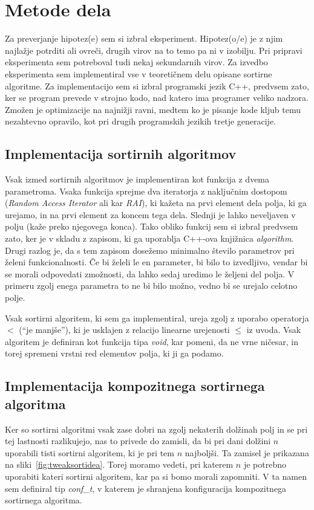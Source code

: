 \documentclass[a4paper,oneside,12pt]{article}
\begin{document}
\section{Metode dela}
Za preverjanje hipotez(e) sem si izbral eksperiment. Hipotez(o/e) je z njim najlažje
potrditi ali ovreči, drugih virov na to temo pa ni v izobilju. Pri pripravi eksperimenta
sem potreboval tudi nekaj sekundarnih virov. Za izvedbo eksperimenta sem implementiral vse 
v teoretičnem delu opisane sortirne algoritme. Za implementacijo sem si izbral programski 
jezik C++, predvsem zato, ker se program prevede v strojno kodo, nad katero ima programer
veliko nadzora. Zmožen je optimizacije na najnižji ravni, medtem ko je pisanje kode kljub
temu nezahtevno opravilo, kot pri drugih programskih jezikih tretje generacije.

\subsection{Implementacija sortirnih algoritmov}
\label{chapter:sortimplementation}
Vsak izmed sortirnih algoritmov je implementiran kot funkcija z dvema parametroma.
Vsaka funkcija sprejme dva iteratorja z naključnim dostopom (\emph{Random Access
Iterator} ali kar \emph{RAI}),
ki kažeta na prvi element dela polja, ki ga urejamo, in na prvi element za koncem tega dela.
Slednji je lahko neveljaven v polju (kaže preko njegovega konca).
Tako obliko funkcij sem si izbral predvsem zato, ker je v skladu z zapisom, ki ga uporablja
C++-ova knjižnica \emph{algorithm}. Drugi razlog je, da s tem zapisom dosežemo minimalno število
parametrov pri želeni funkcionalnosti. Če bi želeli le en parameter, bi bilo to
izvedljivo, vendar bi se morali odpovedati zmožnosti, da lahko sedaj uredimo le željeni
del polja. V primeru zgolj enega parametra to ne bi bilo možno, vedno bi se
urejalo celotno polje.

Vsak sortirni algoritem, ki sem ga implementiral, ureja zgolj z uporabo operatorja $<$
(``je manjše''), ki je usklajen z relacijo linearne urejenosti $\leq$ iz uvoda. Vsak
algoritem je definiran kot funkcija tipa \emph{void}, kar pomeni, da ne vrne ničesar, in
torej spremeni vrstni red elementov polja, ki ji ga podamo.

\subsection{Implementacija kompozitnega sortirnega algoritma}
\label{chapter:tweaksort}
Ker so sortirni algoritmi vsak zase dobri na zgolj nekaterih dolžinah polj in se pri tej
lastnosti razlikujejo, nas to privede do zamisli, da bi pri dani dolžini $n$ uporabili tisti
sortirni algoritem, ki je pri tem $n$ najboljši. Ta zamisel je prikazana na sliki~\ref{fig:tweaksortidea}.
Torej moramo vedeti, pri katerem $n$ je
potrebno uporabiti kateri sortirni algoritem, kar pa si bomo morali zapomniti. V ta
namen sem definiral tip \emph{conf\_\!t}, v katerem je shranjena konfiguracija kompozitnega
sortirnega algoritma. 
\end{document}
